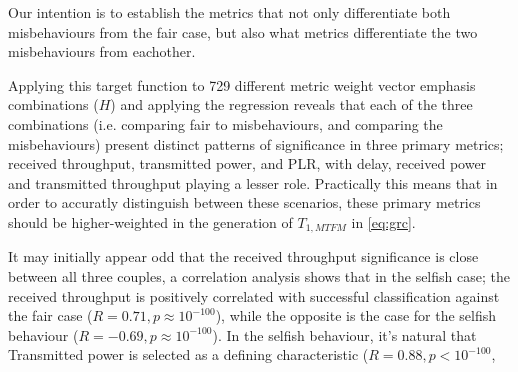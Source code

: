 \documentclass[conference]{IEEEtran}
\begin{document}
Our intention is to establish the metrics that not only differentiate both misbehaviours from the fair case, but also what metrics differentiate the two misbehaviours from eachother.

Applying this target function to 729 different metric weight vector emphasis combinations ($H$) and applying the regression reveals that each of the three combinations (i.e. comparing fair to misbehaviours, and comparing the misbehaviours) present distinct patterns of significance in three primary metrics; received throughput, transmitted power, and PLR, with delay, received power and transmitted throughput playing a lesser role.
Practically this means that in order to accuratly distinguish between these scenarios, these primary metrics should be higher-weighted in the generation of $T_{1,MTFM}$ in \eqref{eq:grc}.

It may initially appear odd that the received throughput significance is close between all three couples, a correlation analysis shows that in the selfish case; the received throughput is positively correlated with successful classification against the fair case ($R=0.71, p\approx10^{-100}$), while the opposite is the case for the selfish behaviour ($R=-0.69, p\approx10^{-100}$).
In the selfish behaviour, it's natural that Transmitted power is selected as a defining characteristic ($R=0.88, p<10^{-100}$, 
\end{document}
